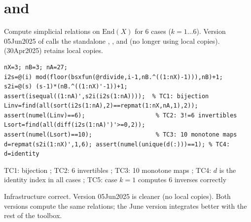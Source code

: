 \chapter{ and }
\begin{tcolorbox}[Abox,title={Analysis}]
Compute simplicial relations on $\mathrm{End}(X)$ for 6 cases ($k=1\ldots6$). Version 05Jun2025 of  calls the standalone , , and  (no longer using local copies).  (30Apr2025) retains local copies.
\end{tcolorbox}
\begin{lstlisting}[caption={Tests for endomapsanalyzer.m}]
nX=3; nB=3; nA=27;
i2s=@(i) mod(floor(bsxfun(@rdivide,i-1,nB.^((1:nX)-1))),nB)+1;
s2i=@(s) (s-1)*(nB.^((1:nX)'-1))+1;
assert(isequal((1:nA)',s2i(i2s(1:nA))));  % TC1: bijection
Linv=find(all(sort(i2s(1:nA),2)==repmat(1:nX,nA,1),2));
assert(numel(Linv)==6);                    % TC2: 3!=6 invertibles
Lsort=find(all(diff(i2s(1:nA)')'>=0,2));
assert(numel(Lsort)==10);                  % TC3: 10 monotone maps
d=repmat(s2i(1:nX)',1,6); assert(numel(unique(d(:)))==1); % TC4: d=identity
\end{lstlisting}
\begin{tcolorbox}[Pbox,title={TC1--TC5 -- All pass}]
TC1: bijection \APROVADO; TC2: 6 invertibles \APROVADO; TC3: 10 monotone maps \APROVADO; TC4: $d$ is the identity index in all cases \APROVADO; TC5: case $k=1$ computes 6 inverses correctly \APROVADO
\end{tcolorbox}
\begin{concl}
Infrastructure correct. Version 05Jun2025 is cleaner (no local copies). Both versions compute the same relations; the June version integrates better with the rest of the toolbox.
\end{concl}

